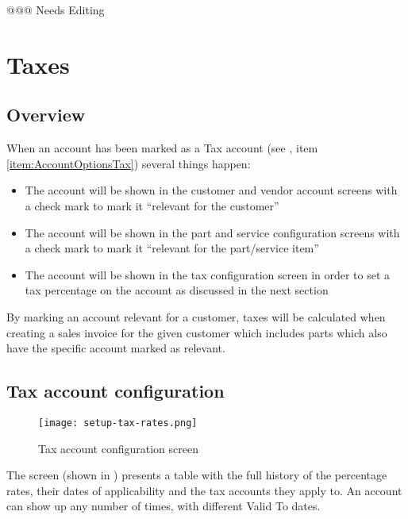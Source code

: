 @@@ Needs Editing

\chapter{Taxes}
\label{cha-taxes}

\section{Overview}
\label{sec-tax-overview}

When an account has been marked as a Tax account (see , item
\ref{item:AccountOptionsTax}) several things happen:

\begin{itemize}
\item The account will be shown in the \gls{customer} and vendor account screens with
   a check mark to mark it ``relevant for the customer''
\item The account will be shown in the part and service configuration screens
   with a check mark to mark it ``relevant for the part/service item''
\item The account will be shown in the tax configuration screen in order to set
   a tax percentage on the account as discussed in the next section
\end{itemize}

By marking an account relevant for a \gls{customer}, taxes will be calculated when
creating a sales invoice for the given customer which includes parts which also
have the specific account marked as relevant.

\section{Tax account configuration}
\label{sec-tax-account-configuration}

\begin{figure}[h]
\centering
\texttt{[image: setup-tax-rates.png]}
\caption{Tax account configuration screen}
\end{figure}
\label{fig:tax-account-config-screen}

The screen (shown in ) presents a table with
the full history of the percentage rates, their dates of applicability and the tax
accounts they apply to. An account can show up any number of times, with different
Valid To dates.

